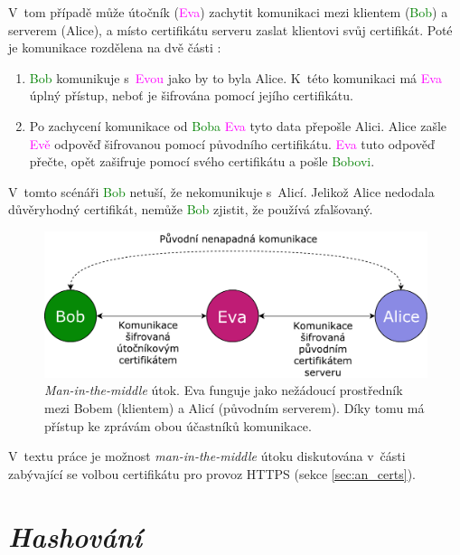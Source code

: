 V~tom případě může útočník (\textcolor{magenta}{Eva}) zachytit komunikaci mezi klientem (\textcolor{green}{Bob}) a serverem (\textcolor{blue2}{Alice}), a místo certifikátu serveru zaslat klientovi svůj certifikát. Poté je komunikace rozdělena na dvě části \cite{mitm}:

\begin{enumerate}
    \item \textcolor{green}{Bob} komunikuje s~\textcolor{magenta}{Evou} jako by to byla \textcolor{blue2}{Alice}. K~této komunikaci má \textcolor{magenta}{Eva} úplný přístup, neboť je šifrována pomocí jejího certifikátu.
    \item Po zachycení komunikace od \textcolor{green}{Boba} \textcolor{magenta}{Eva} tyto data přepošle \textcolor{blue2}{Alici}. \textcolor{blue2}{Alice} zašle \textcolor{magenta}{Evě} odpověď šifrovanou pomocí původního certifikátu. \textcolor{magenta}{Eva} tuto odpověď přečte, opět zašifruje pomocí svého certifikátu a pošle \textcolor{green}{Bobovi}.
\end{enumerate}

V~tomto scénáři \textcolor{green}{Bob} netuší, že nekomunikuje s~\textcolor{blue2}{Alicí}. Jelikož \textcolor{blue2}{Alice} nedodala důvěryhodný certifikát, nemůže \textcolor{green}{Bob} zjistit, že používá zfalšovaný.

\begin{figure}[h!]
    \centering
    \includegraphics[width=\textwidth]{images/mitm.pdf}
    \caption[\textit{Man-in-the-middle} útok]{\textit{Man-in-the-middle} útok. Eva funguje jako nežádoucí prostředník mezi Bobem (klientem) a Alicí (původním serverem). Díky tomu má přístup ke zprávám obou účastníků komunikace. \cite{mitm}}
    \label{fig:mitm}
\end{figure}

V~textu práce je možnost \textit{man-in-the-middle} útoku diskutována v~části zabývající se volbou certifikátu pro provoz HTTPS (sekce \ref{sec:an_certs}).

\section{\textit{Hashování}}

